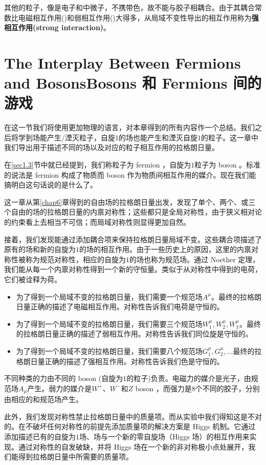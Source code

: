 其他的\spint 粒子，像是电子和中微子，不携带色，故不能与胶子相耦合。由于其耦合常数比电磁相互作用(\uo)和弱相互作用(\sutw)大得多，从局域\suth 不变性导出的相互作用称为{\bf 强相互作用(strong interaction)}。

\section[Bosons 和 Fermions 间的游戏]{The Interplay Between Fermions and Bosons\quad Bosons 和 Fermions 间的游戏}\label{sec7.9}

在这一节我们将使用更加物理的语言，对本章得到的所有内容作一个总结。我们之后将学到\spint 场能产生/湮灭\spint 粒子，自旋$1$的场也能产生和湮灭自旋$1$的粒子。这一章中我们导出用于描述不同的场以及对应的粒子相互作用的拉格朗日量。

在\ref{sec1.3}节中就已经提到，我们称\spint 粒子为 fermion ，自旋为$1$粒子为 boson 。标准的说法是 fermion 构成了物质而 boson 作为物质间相互作用的媒介。现在我们能搞明白这句话说的是什么了。

这一章从第\ref{chap6}章得到的自由场的拉格朗日量出发，发现了单个、两个、或三个自由的\spint 场的拉格朗日量的内禀对称性；这些都只是全局对称性，由于狭义相对论的约束看上去相当不可信；而局域对称性则显得更加自然。

接着，我们发现能通过添加耦合项来保持拉格朗日量局域不变。这些耦合项描述了原有的\spint 场和新的自旋为$1$的场的相互作用。由于一些历史上的原因，这里的内禀对称性被称为规范对称性，相应的自旋为$1$的场也称为规范场。通过 Noether 定理，我们能从每一个内禀对称性得到一个新的守恒量。类似于从\uo 对称性中得到的电荷，它们被诠释为荷。

\begin{itemize}
\item 为了得到一个局域\uo 不变的拉格朗日量，我们需要一个规范场$A^\mu$。最终的拉格朗日量正确的描述了电磁相互作用。\uo 对称性告诉我们电荷是守恒的。
\item 为了得到一个局域\sutw 不变的拉格朗日量，我们需要三个规范场$W_1^\mu,W_2^\mu,W_3^\mu$。最终的拉格朗日量正确的描述了弱相互作用。\sutw 对称性告诉我们同位旋是守恒的。
\item 为了得到一个局域\suth 不变的拉格朗日量，我们需要八个规范场$G_1^\mu,G_2^\mu,\dots$最终的拉格朗日量正确的描述了强相互作用。\suth 对称性告诉我们色是守恒的。
\end{itemize}

不同种类的力由不同的 boson (自旋为$1$的粒子)负责。电磁力的媒介是光子，由\uo 规范场$A_\mu$产生。弱力的媒介是$W^+$、$W^-$和$Z$ boson ，而强力是$8$个不同的胶子，分别由相应的\sutw 和\suth 规范场产生。

此外，我们发现\sutw 对称性禁止拉格朗日量中的质量项。而从实验中我们得知这是不对的。在不破坏任何对称性的前提先添加质量项的解决方案是 Higgs 机制。它通过添加描述已有的自旋为$1$场、\spint 场与一个新的零自旋场（Higgs 场）的相互作用来实现。通过\sutw 对称性的自发破缺，并将 Higgs 场在一个新的非对称极小点处展开，我们能得到拉格朗日量中所需要的质量项。

